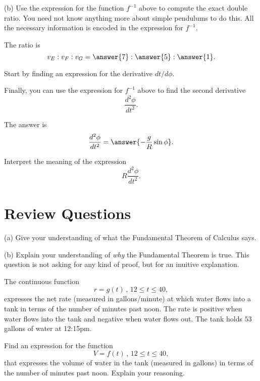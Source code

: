 \documentclass{ximera}
\begin{document}
\begin{question}
(b) Use the expression for the function $f^{-1}$ above to compute the exact double ratio. You need not know anything more about simple pendulums to do this. All the necessary information is encoded in the expression for $f^{-1}$. 

The ratio is
\[
      v_E : v_F : v_G = \answer{7}: \answer{5}:\answer{1} .
\]

\begin{hint}
Start by finding an expression for the derivative $dt/d\phi$.
\end{hint}

Finally, you can use the expression for $f^{-1}$ above to find the second derivative
\[
    \frac{d^2\phi}{dt^2}.
\]

The answer is
\[
         \frac{d^2\phi}{dt^2} = \answer{-\frac{g}{R}\sin\phi} .
\]


\begin{freeResponse}
Interpret the meaning of the expression
\[
   R \frac{d^2\phi}{dt^2}.
\]
\end{freeResponse}

\end{question}

\section*{Review Questions}

\begin{question}  \label{Qdfdsftt5466544}
(a) Give your understanding of what the Fundamental Theorem of Calculus says.

(b) Explain your understanding of \emph{why} the Fundamental Theorem is true. This question is not asking for any kind of proof, but for an inuitive explanation.
\end{question}


\begin{question}  \label{Q45rfdg55}
The continuous function
\[
  r = g(t) \, ,  \, 12 \leq t \leq 40,
\]
expresses the net rate (measured in gallons/minute) at which water flows into a tank in terms of the number of minutes past noon. The rate is positive when water flows into the tank and negative when water flows out. The tank holds $53$ gallons of water at 12:15pm.

Find an expression for the function
\[
    V = f(t)\, ,  \, 12 \leq t \leq 40,
\]
that expresses the volume of water in the tank (measured in gallons) in terms of the number of minutes past noon. Explain your reasoning.

\end{question}
\end{document}
